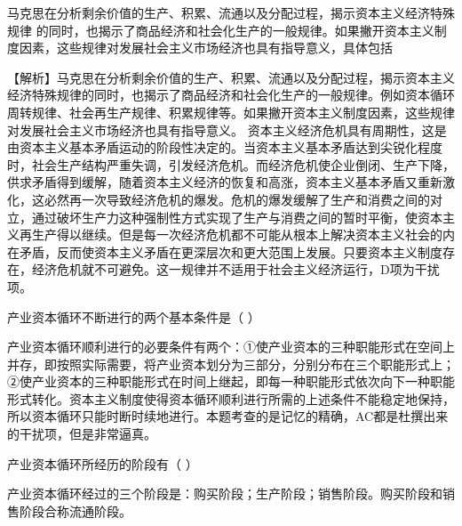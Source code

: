\question 马克思在分析剩余价值的生产、积累、流通以及分配过程，揭示资本主义经济特殊规律
的同时，也揭示了商品经济和社会化生产的一般规律。如果撇开资本主义制度因素，这些规律对发展社会主义市场经济也具有指导意义，具体包括
\par{}
\begin{solution}【解析】马克思在分析剩余价值的生产、积累、流通以及分配过程，揭示资本主义经济特殊规律的同时，也揭示了商品经济和社会化生产的一般规律。例如资本循环周转规律、社会再生产规律、积累规律等。如果撇开资本主义制度因素，这些规律对发展社会主义市场经济也具有指导意义。
资本主义经济危机具有周期性，这是由资本主义基本矛盾运动的阶段性决定的。当资本主义基本矛盾达到尖锐化程度时，社会生产结构严重失调，引发经济危机。而经济危机使企业倒闭、生产下降，供求矛盾得到缓解，随着资本主义经济的恢复和高涨，资本主义基本矛盾又重新激化，这必然再一次导致经济危机的爆发。危机的爆发缓解了生产和消费之间的对立，通过破坏生产力这种强制性方式实现了生产与消费之间的暂时平衡，使资本主义再生产得以继续。但是每一次经济危机都不可能从根本上解决资本主义社会的内在矛盾，反而使资本主义矛盾在更深层次和更大范围上发展。只要资本主义制度存在，经济危机就不可避免。这一规律并不适用于社会主义经济运行，D项为干扰项。
\end{solution}
\question 产业资本循环不断进行的两个基本条件是（ ）
\par{}
\begin{solution}产业资本循环顺利进行的必要条件有两个：①使产业资本的三种职能形式在空间上并存，即按照实际需要，将产业资本划分为三部分，分别分布在三个职能形式上；②使产业资本的三种职能形式在时间上继起，即每一种职能形式依次向下一种职能形式转化。资本主义制度使得资本循环顺利进行所需的上述条件不能稳定地保持，所以资本循环只能时断时续地进行。本题考查的是记忆的精确，AC都是杜撰出来的干扰项，但是非常逼真。
\end{solution}
\question 产业资本循环所经历的阶段有（ ）
\par{}
\begin{solution}产业资本循环经过的三个阶段是：购买阶段；生产阶段；销售阶段。购买阶段和销售阶段合称流通阶段。
\end{solution}
